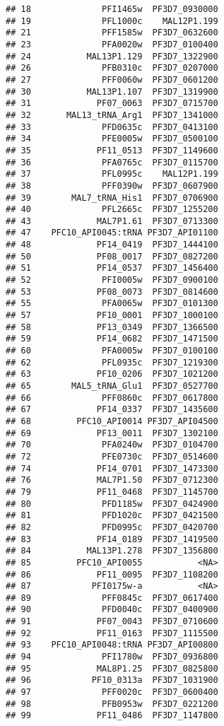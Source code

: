 \documentclass{article}\usepackage[]{graphicx}\usepackage[]{color}
\makeatletter
\newenvironment{kframe}{%
 \def\at@end@of@kframe{}%
 \ifinner\ifhmode%
  \def\at@end@of@kframe{\end{minipage}}%
  \begin{minipage}{\columnwidth}%
 \fi\fi%
 \def\FrameCommand##1{\hskip\@totalleftmargin \hskip-\fboxsep
 \colorbox{shadecolor}{##1}\hskip-\fboxsep
     \hskip-\linewidth \hskip-\@totalleftmargin \hskip\columnwidth}%
 \MakeFramed {\advance\hsize-\width
   \@totalleftmargin\z@ \linewidth\hsize
   \@setminipage}}%
 {\par\unskip\endMakeFramed%
 \at@end@of@kframe}
\newenvironment{knitrout}{}{} %
\makeatother
\begin{document}
\begin{knitrout}
\begin{kframe}
\begin{verbatim}
## 18              PFI1465w  PF3D7_0930000
## 19              PFL1000c    MAL12P1.199
## 21              PFF1585w  PF3D7_0632600
## 23              PFA0020w  PF3D7_0100400
## 24           MAL13P1.129  PF3D7_1322900
## 26              PFB0310c  PF3D7_0207000
## 27              PFF0060w  PF3D7_0601200
## 30           MAL13P1.107  PF3D7_1319900
## 31             PF07_0063  PF3D7_0715700
## 32       MAL13_tRNA_Arg1  PF3D7_1341000
## 33              PFD0635c  PF3D7_0413100
## 34              PFE0005w  PF3D7_0500100
## 35             PF11_0513  PF3D7_1149600
## 36              PFA0765c  PF3D7_0115700
## 37              PFL0995c    MAL12P1.199
## 38              PFF0390w  PF3D7_0607900
## 39        MAL7_tRNA_His1  PF3D7_0706900
## 40              PFL2665c  PF3D7_1255200
## 43             MAL7P1.61  PF3D7_0713300
## 47    PFC10_API0045:tRNA PF3D7_API01100
## 48             PF14_0419  PF3D7_1444100
## 50             PF08_0017  PF3D7_0827200
## 51             PF14_0537  PF3D7_1456400
## 52              PFI0005w  PF3D7_0900100
## 53             PF08_0073  PF3D7_0814600
## 55              PFA0065w  PF3D7_0101300
## 57             PF10_0001  PF3D7_1000100
## 58             PF13_0349  PF3D7_1366500
## 59             PF14_0682  PF3D7_1471500
## 60              PFA0005w  PF3D7_0100100
## 62              PFL0935c  PF3D7_1219300
## 63             PF10_0206  PF3D7_1021200
## 65        MAL5_tRNA_Glu1  PF3D7_0527700
## 66              PFF0860c  PF3D7_0617800
## 67             PF14_0337  PF3D7_1435600
## 68         PFC10_API0014 PF3D7_API04500
## 69             PF13_0011  PF3D7_1302100
## 70              PFA0240w  PF3D7_0104700
## 72              PFE0730c  PF3D7_0514600
## 74             PF14_0701  PF3D7_1473300
## 76             MAL7P1.50  PF3D7_0712300
## 79             PF11_0468  PF3D7_1145700
## 80              PFD1185w  PF3D7_0424900
## 81              PFD1020c  PF3D7_0421500
## 82              PFD0995c  PF3D7_0420700
## 83             PF14_0189  PF3D7_1419500
## 84           MAL13P1.278  PF3D7_1356800
## 85         PFC10_API0055           <NA>
## 86             PF11_0095  PF3D7_1108200
## 87            PFI0175w-a           <NA>
## 89              PFF0845c  PF3D7_0617400
## 90              PFD0040c  PF3D7_0400900
## 91             PF07_0043  PF3D7_0710600
## 92             PF11_0163  PF3D7_1115500
## 93    PFC10_API0048:tRNA PF3D7_API00800
## 94              PFI1780w  PF3D7_0936800
## 95             MAL8P1.25  PF3D7_0825800
## 96            PF10_0313a  PF3D7_1031900
## 97              PFF0020c  PF3D7_0600400
## 98              PFB0953w  PF3D7_0221200
## 99             PF11_0486  PF3D7_1147800

\end{verbatim}
\end{kframe}
\end{knitrout}
\end{document}
